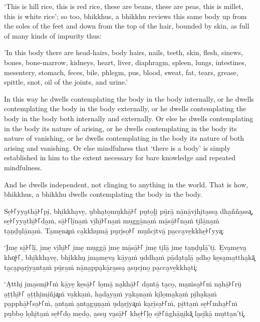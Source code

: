 ‘This is hill rice, this is red rice, these are beans, these are peas, this is
millet, this is white rice’; so too, bhikkhus, a bhikkhu reviews this same body
up from the soles of the feet and down from the top of the hair, bounded by
skin, as full of many kinds of impurity thus:

'In this body there are head-hairs, body hairs, nails, teeth, skin, flesh,
sinews, bones, bone-marrow, kidneys, heart, liver, diaphragm, spleen, lungs,
intestines, mesentery, stomach, feces, bile, phlegm, pus, blood, sweat, fat,
tears, grease, spittle, snot, oil of the joints, and urine.'

In this way he dwells contemplating the body in the body internally, or he
dwells contemplating the body in the body externally, or he dwells contemplating
the body in the body both internally and externally. Or else he dwells
contemplating in the body its nature of arising, or he dwells contemplating in
the body its nature of vanishing, or he dwells contemplating in the body its
nature of both arising and vanishing. Or else mindfulness that ‘there is a body’
is simply established in him to the extent necessary for bare knowledge and
repeated mindfulness.

And he dwells independent, not clinging to anything in the world. That is how,
bhikkhus, a bhikkhu dwells contemplating the body in the body.


\paliPage

Se̱꜔꜒yya̮thā̱꜔꜒pi̮, bhi̱kkha̮ve̱, u̮bha̮to̱mu̮khā̱꜔꜒ pu̮to̱ḷi̮ pū̱rā̱ nā̱nā̱vi̮hi̮ta̱ssa̮ dha̱ñña̱ssa͓,
se̱꜔꜒yya̮thī̱꜔꜒da̱ṁ, sā̱꜔꜒lī̱na̱ṁ vī̱hī̱꜔꜒na̱ṁ mu̱ggā̱na̱ṁ mā̱sā̱꜔꜒na̱ṁ ti̮lā̱na̱ṁ ta̱ṇḍu̮lā̱na̱ṁ. Ta̮me̱na͓ṁ
ca̱kkhu̮mā̱ pu̮ri̮so̱꜔꜒ mu̱ñci̱tvā̱ pa̱cca̮ve̱kkhe̱꜔꜒yya͓:

‘I̮me̱ sā̱꜔꜒lī̱, i̮me̱ vī̱hī̱꜔꜒ i̮me̱ mu̱ggā̱ i̮me̱ mā̱sā̱꜔꜒ i̮me̱ ti̮lā̱ i̮me̱ ta̱ṇḍu̮lā̱’ti̮. E̱va̮me̱va̮ kho͓꜔꜒,
bhi̱kkha̮ve̱, bhi̱kkhu̮ i̮ma̮me̱va̮ kā̱ya̱ṁ u̱ddha̱ṁ pā̱da̮ta̮lā̱ a̮dho̱ ke̱sa̮ma̱ttha̮kā͓
ta̮ca̮pa̮ri̮ya̱nta̱ṁ pū̱ra̱ṁ nā̱na̱ppa̮kā̱ra̱ssa̮ a̮su̮ci̮no̱ pa̱cca̮ve̱kkha̮ti͓:

‘A̱tthi̮ i̮ma̱smi̱꜔꜒ṁ kā̱ye̱ ke̱sā̱꜔꜒ lo̱mā̱ na̮khā̱꜔꜒ da̱ntā̱ ta̮co̱, ma̱ṁsa̱꜔꜒ṁ na̮hā̱꜔꜒rū̱ a̱ṭṭhī̱꜔꜒ a̱ṭṭhi̮mi̱ñja͓ṁ
va̱kka̱ṁ, ha̮da̮ya̱ṁ ya̮ka̮na̱ṁ ki̮lo̱ma̮ka̱ṁ pi̮ha̮ka̱ṁ pa̱pphā̱꜔꜒sa̱꜔꜒ṁ, a̱nta̱ṁ a̱nta̮gu̮ṇa̱ṁ u̮da̮ri̮ya͓ṁ
ka̮rī̱sa̱꜔꜒ṁ, pi̱tta̱ṁ se̱꜔꜒mha̱꜔꜒ṁ pu̱bbo̱ lo̱hi̮ta̱ṁ se̱꜔꜒do̱ me̱do̱, a̱ssu̮ va̮sā̱꜔꜒ khe̱꜔꜒ḷo̱ si̱꜔꜒ṅghā̱ṇi̮kā͓
la̮si̮kā̱ mu̱tta̱n’ti͓.

